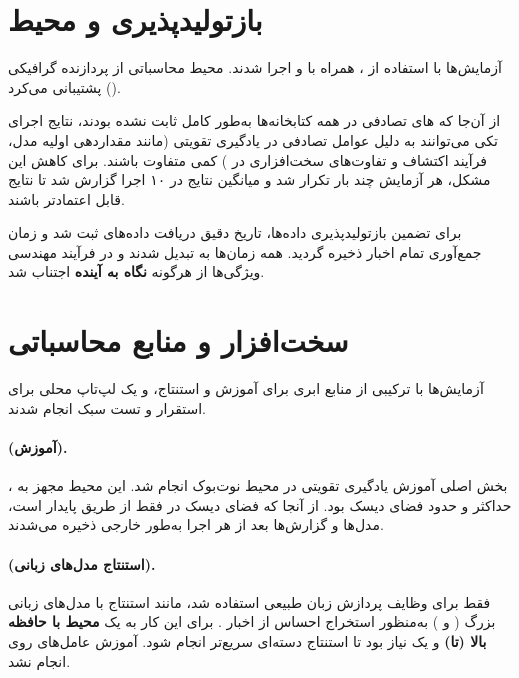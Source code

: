 \documentclass[12pt, a4paper]{report}
\begin{document}
\section{بازتولیدپذیری و محیط}

آزمایش‌ها با استفاده از ، همراه با  و  اجرا شدند.  
محیط محاسباتی از پردازنده گرافیکی () پشتیبانی می‌کرد.  

از آن‌جا که های تصادفی در همه کتابخانه‌ها به‌طور کامل ثابت نشده بودند، 
نتایج اجرای تکی می‌توانند به دلیل عوامل تصادفی در یادگیری تقویتی 
(مانند مقداردهی اولیه مدل، فرآیند اکتشاف و تفاوت‌های سخت‌افزاری در ) کمی متفاوت باشند.  
برای کاهش این مشکل، هر آزمایش چند بار تکرار شد و میانگین نتایج در ۱۰ اجرا گزارش شد 
تا نتایج قابل اعتمادتر باشند.  

برای تضمین بازتولیدپذیری داده‌ها، تاریخ دقیق دریافت داده‌های  ثبت شد 
و زمان جمع‌آوری تمام اخبار  ذخیره گردید.  
همه زمان‌ها به  تبدیل شدند و در فرآیند مهندسی ویژگی‌ها از هرگونه \textbf{نگاه به آینده} اجتناب شد.  

\section{سخت‌افزار و منابع محاسباتی}

آزمایش‌ها با ترکیبی از منابع ابری برای آموزش و استنتاج،  
و یک لپ‌تاپ محلی برای استقرار و تست سبک انجام شدند.  

\paragraph{ (آموزش).}
بخش اصلی آموزش یادگیری تقویتی در محیط نوت‌بوک  انجام شد.  
این محیط مجهز به ،  
حداکثر  و حدود   فضای دیسک بود.  
از آنجا که فضای دیسک در  فقط از طریق  پایدار است،  
مدل‌ها و گزارش‌ها بعد از هر اجرا به‌طور خارجی ذخیره می‌شدند.  

\paragraph{ (استنتاج مدل‌های زبانی).}
 فقط برای وظایف پردازش زبان طبیعی استفاده شد،  
مانند استنتاج با مدل‌های زبانی بزرگ ( و )  
به‌منظور استخراج احساس از اخبار .  
برای این کار به یک \textbf{محیط با حافظه بالا (تا)}  
و یک  نیاز بود  
تا استنتاج دسته‌ای سریع‌تر انجام شود.  
آموزش عامل‌های  روی  انجام نشد.  
\end{document}

